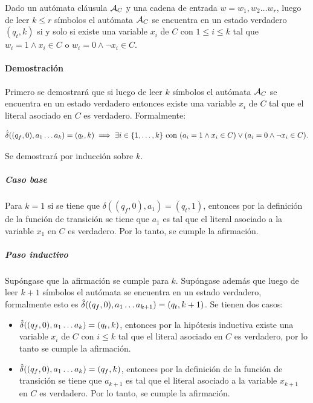\begin{lemma}
    \label{lem:ac}
    Dado un autómata cláusula $\mathcal{A}_{C}$ y una cadena de entrada $w = w_1, w_2 \dots w_r$, luego de leer $k \leq r$ símbolos el autómata $\mathcal{A}_{C}$ se encuentra en un estado verdadero $(q_t, k)$ si y solo si existe una variable $x_i$ de $C$ con $1 \leq i \leq k$  tal que $w_i = 1 \land x_i \in C$ o $w_i = 0 \land \neg x_i \in C$.
\end{lemma}

\paragraph{Demostración} Primero se demostrará que si luego de leer $k$ símbolos el autómata $\mathcal{A}_C$ se encuentra en un estado verdadero entonces existe una variable $x_i$ de $C$ tal que el literal asociado en $C$ es verdadero. Formalmente:

\begin{equation}
    \label{eq:ac-implies}
    \hat{\delta}((q_f, 0), a_1 \ldots a_k) = (q_t, k) \implies \exists i \in \{1, \ldots, k \} \text{ con } (a_i = 1 \land x_i \in C) \lor (a_i = 0 \land \neg x_i \in C).
\end{equation}


Se demostrará por inducción sobre $k$.

\subparagraph{Caso base} Para $k = 1$ si se tiene que $\delta((q_f, 0), a_1) = (q_t, 1)$, entonces por la definición de la función de transición se tiene que $a_1$ es tal que el literal asociado a la variable $x_1$ en $C$ es verdadero. Por lo tanto, se cumple la afirmación.

\subparagraph{Paso inductivo} Supóngase que la afirmación se cumple para $k$. Supóngase además que luego de leer $k+1$ símbolos el autómata se encuentra en un estado verdadero, formalmente esto es $\hat{\delta}((q_f, 0), a_1 \ldots a_{k+1}) = (q_t, k+1)$. Se tienen dos casos:

\begin{itemize}
    \item $\hat{\delta}((q_f, 0), a_1 \ldots a_k) = (q_t, k)$, entonces por la hipótesis inductiva existe una variable $x_i$ de $C$ con $i \leq k$ tal que el literal asociado en $C$ es verdadero, por lo tanto se cumple la afirmación.
    \item $\hat{\delta}((q_f, 0), a_1 \ldots a_k) = (q_f, k)$, entonces por la definición de la función de transición se tiene que $a_{k+1}$ es tal que el literal asociado a la variable $x_{k+1}$ en $C$ es verdadero. Por lo tanto, se cumple la afirmación.

\end{itemize}

